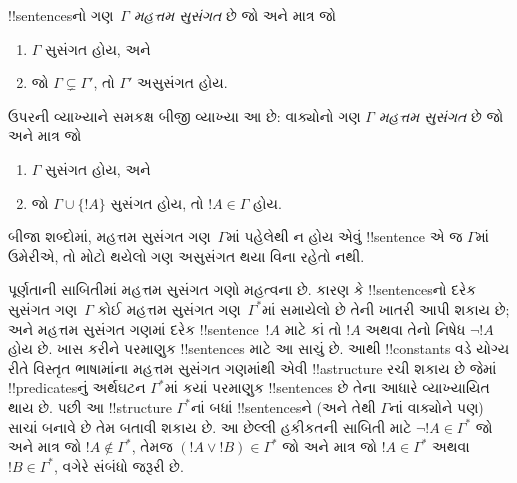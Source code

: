 \documentclass[../../../include/open-logic-section]{subfiles}
\begin{document}

\begin{defn}[મહત્તમ સુસંગત ગણ]
!!{sentence}sનો ગણ~$\Gamma$ \emph{મહત્તમ સુસંગત} છે જો અને માત્ર જો
\begin{enumerate}
\item $\Gamma$ સુસંગત હોય, અને
\item જો $\Gamma \subsetneq \Gamma'$, તો $\Gamma'$ અસુસંગત હોય.
\end{enumerate}
\end{defn}

\begin{explain}
ઉપરની વ્યાખ્યાને સમકક્ષ
બીજી વ્યાખ્યા આ છે:
વાક્યોનો ગણ $\Gamma$
\emph{મહત્તમ સુસંગત} છે
જો અને માત્ર જો
\begin{enumerate}
\item $\Gamma$ સુસંગત હોય, અને
\item જો $\Gamma \cup \{ !A \}$ સુસંગત હોય,
તો $!A \in \Gamma$ હોય.
\end{enumerate}
બીજા શબ્દોમાં, મહત્તમ સુસંગત
ગણ~$\Gamma$માં પહેલેથી ન
હોય એવું !!{sentence} એ જ $\Gamma$માં ઉમેરીએ,
તો મોટો થયેલો ગણ
અસુસંગત થયા વિના રહેતો નથી.
\end{explain}

\begin{explain}
પૂર્ણતાની સાબિતીમાં મહત્તમ સુસંગત
ગણો મહત્વના છે. કારણ કે
!!{sentence}sનો દરેક સુસંગત
ગણ~$\Gamma$ કોઈ મહત્તમ
સુસંગત ગણ~$\Gamma^*$માં
સમાયેલો છે તેની ખાતરી
આપી શકાય છે; અને
મહત્તમ સુસંગત ગણમાં
દરેક !!{sentence}~$!A$
માટે કાં તો $!A$ અથવા
તેનો નિષેધ $\lnot !A$
હોય છે. ખાસ કરીને
પરમાણુક !!{sentence}s
માટે આ સાચું છે.
આથી !!{constant}s વડે
યોગ્ય રીતે વિસ્તૃત
ભાષામાંના મહત્તમ
સુસંગત ગણમાંથી
એવી !!a{structure}
રચી શકાય છે જેમાં
!!{predicate}sનું અર્થઘટન
$\Gamma^*$માં કયાં
પરમાણુક !!{sentence}s
છે તેના આધારે
વ્યાખ્યાયિત થાય છે.
પછી આ !!{structure}
$\Gamma^*$નાં બધાં
!!{sentence}sને
(અને તેથી $\Gamma$નાં
વાક્યોને પણ) સાચાં
બનાવે છે તેમ બતાવી
શકાય છે. આ છેલ્લી
હકીકતની સાબિતી માટે
$\lnot !A \in
\Gamma^*$ જો અને માત્ર જો
$!A \notin \Gamma^*$,
તેમજ $(!A \lor !B) \in \Gamma^*$
જો અને માત્ર જો
$!A \in \Gamma^*$ અથવા
$!B \in \Gamma^*$,
વગેરે સંબંધો જરૂરી છે.
\end{explain}
\end{document}
